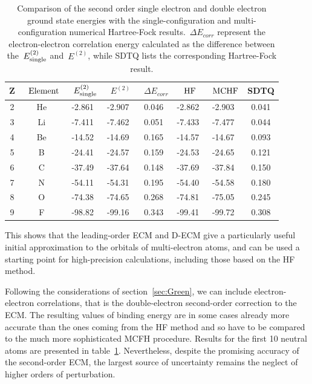 \begin{table}[b]%
    \centering
    \begin{tabular}{cc|cccccc}
         Z &~$\rm{Element}$ &~$E^{(2)}_{\rm{single}}$ &~$E^{(2)}$ &~$\Delta E_{corr}$ &~$\rm{HF}$ &~$\rm{MCHF}$ & \rm{SDTQ}\\
         \hline
        \hline
         2 & He & -2.861 & -2.907 & 0.046 & -2.862 & -2.903 & 0.041 \\
         3 &Li & -7.411 & -7.462 & 0.051 & -7.433 & -7.477 & 0.044\\
         4 & Be & -14.52 & -14.69 & 0.165 & -14.57 & -14.67 & 0.093\\
         5 & B & -24.41 & -24.57 & 0.159 & -24.53 & -24.65 & 0.121\\
         6 & C & -37.49 & -37.64 & 0.148 & -37.69 & -37.84 & 0.150\\
         7 & N & -54.11 & -54.31 & 0.195 &-54.40 & -54.58 & 0.180\\
         8 & O & -74.38 & -74.65 & 0.268 & -74.81 & -75.05 & 0.245\\
         9 & F & -98.82 & -99.16 & 0.343 & -99.41 & -99.72 & 0.308\\
         \hline
    \end{tabular}
    \caption{Comparison of the second order single electron and double electron ground state energies with the single-configuration and multi-configuration numerical Hartree-Fock results.~$\Delta E_{corr}$ represent the electron-electron correlation energy calculated as the difference between the~$E^{(2)}_{\rm{single}}$ and~$E^{(2)}$, while SDTQ lists the corresponding Hartree-Fock result.}
    \label{tab:correlations}
\end{table}

This shows that the leading-order ECM and D-ECM give a particularly useful initial approximation to the orbitals of multi-electron atoms, and can be used a starting point for high-precision calculations, including those based on the HF method.

Following the considerations of section~\ref{sec:Green}, we can include electron-electron correlations, that is the double-electron second-order correction to the ECM. The resulting values of binding energy are in some cases already more accurate than the ones coming from the HF method and so have to be compared to the much more sophisticated MCFH procedure. Results for the first 10 neutral atoms are presented in table~\ref{tab:correlations}. Nevertheless, despite the promising accuracy of the second-order ECM, the largest source of uncertainty remains the neglect of higher orders of perturbation.

